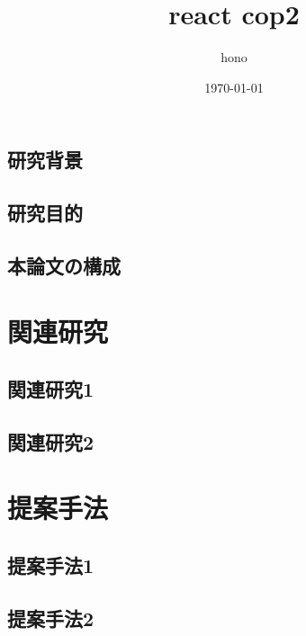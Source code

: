 \documentclass[a4paper]{jarticle}
\title{\Huge react cop2}%
\date{\today}%
\author{\quad hono}%
\begin{document}
    \maketitle
    \newpage
    \tableofcontents%
    \newpage






\subsection{研究背景}
\subsection{研究目的}
\subsection{本論文の構成}

\section{関連研究}
\subsection{関連研究1}
\subsection{関連研究2}

\section{提案手法}
\subsection{提案手法1}
\subsection{提案手法2}
\end{document}
